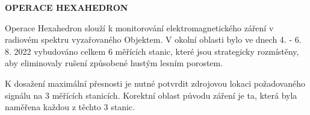 \documentclass[a4paper, \fontheight]{article}
\begin{document}
\pagebreak
{\centering \bfseries \ttfamily \Huge OPERACE HEXAHEDRON \par}

\ttfamily
\vspace{11pt}
Operace Hexahedron slouží k monitorování elektromagnetického záření v radiovém spektru vyzařovaného Objektem. V okolní oblasti bylo ve dnech 4. - 6. 8. 2022 vybudováno celkem 6 měřících stanic, které jsou strategicky rozmístěny, aby eliminovaly rušení způsobené hustým lesním porostem.

K dosažení maximální přesnosti je nutné potvrdit zdrojovou lokaci požadovaného signálu na 3 měřících stanicích. Korektní oblast původu záření je ta, která byla naměřena každou z těchto 3 stanic.
\end{document}
